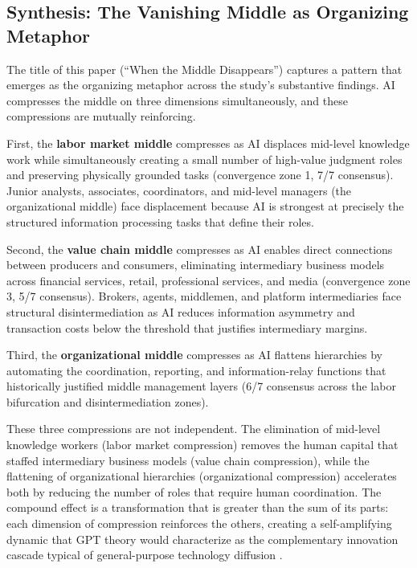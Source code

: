 \documentclass[preprint,review,12pt]{elsarticle}
\begin{document}
\subsection{Synthesis: The Vanishing Middle as Organizing Metaphor}
\label{sec:vanishing_middle}

The title of this paper (``When the Middle Disappears'') captures a pattern that emerges as the organizing metaphor across the study's substantive findings. AI compresses the middle on three dimensions simultaneously, and these compressions are mutually reinforcing.

First, the \textbf{labor market middle} compresses as AI displaces mid-level knowledge work while simultaneously creating a small number of high-value judgment roles and preserving physically grounded tasks (convergence zone 1, 7/7 consensus). Junior analysts, associates, coordinators, and mid-level managers (the organizational middle) face displacement because AI is strongest at precisely the structured information processing tasks that define their roles.

Second, the \textbf{value chain middle} compresses as AI enables direct connections between producers and consumers, eliminating intermediary business models across financial services, retail, professional services, and media (convergence zone 3, 5/7 consensus). Brokers, agents, middlemen, and platform intermediaries face structural disintermediation as AI reduces information asymmetry and transaction costs below the threshold that justifies intermediary margins.

Third, the \textbf{organizational middle} compresses as AI flattens hierarchies by automating the coordination, reporting, and information-relay functions that historically justified middle management layers (6/7 consensus across the labor bifurcation and disintermediation zones).

These three compressions are not independent. The elimination of mid-level knowledge workers (labor market compression) removes the human capital that staffed intermediary business models (value chain compression), while the flattening of organizational hierarchies (organizational compression) accelerates both by reducing the number of roles that require human coordination. The compound effect is a transformation that is greater than the sum of its parts: each dimension of compression reinforces the others, creating a self-amplifying dynamic that GPT theory would characterize as the complementary innovation cascade typical of general-purpose technology diffusion \citep{bresnahan1995gpt, helpman1998gpt}.
\end{document}
